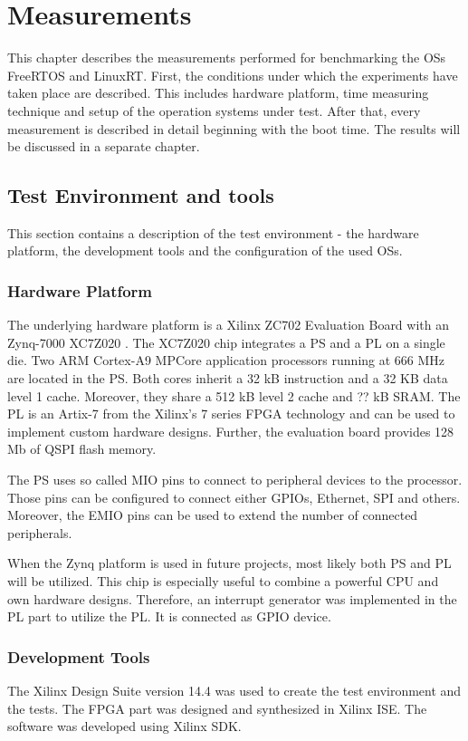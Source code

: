 \chapter{Measurements}\label{ch_measurements}
This chapter describes the measurements performed for benchmarking the \acp{OS} FreeRTOS and LinuxRT.
First, the conditions under which the experiments have taken place are described.
This includes hardware platform, time measuring technique and setup of the operation systems under test.
After that, every measurement is described in detail beginning with the boot time.
The results will be discussed in a separate chapter.

\section{Test Environment and tools}
This section contains a description of the test environment - the hardware platform, the development tools and the configuration of the used \acp{OS}.
\subsection{Hardware Platform}
The underlying hardware platform is a Xilinx ZC702 Evaluation Board \cite{xilinx:zc702_ev_board} with an Zynq-7000 XC7Z020 \cite{xilinx:zynq7000}.
The XC7Z020 chip integrates a \ac{PS} and a \ac{PL} on a single die.
Two ARM Cortex-A9 MPCore application processors running at 666 MHz are located in the \ac{PS}.
Both cores inherit a 32 kB instruction and a 32 KB data level 1 cache.
Moreover, they share a 512 kB level 2 cache and ?? kB SRAM.
The \ac{PL} is an Artix-7 from the Xilinx's 7 series \ac{FPGA} technology and can be used to implement custom hardware designs.
Further, the evaluation board provides 128 Mb of \ac{QSPI} flash memory.
\par
The \ac{PS} uses so called \ac{MIO} pins to connect to peripheral devices to the processor.
Those pins can be configured to connect either \acp{GPIO}, Ethernet, \ac{SPI} and others.
Moreover, the \ac{EMIO} pins can be used to extend the number of connected peripherals.
\par
When the Zynq platform is used in future projects, most likely both \ac{PS} and \ac{PL} will be utilized.
This chip is especially useful to combine a powerful \ac{CPU} and own hardware designs.
Therefore, an interrupt generator was implemented in the \ac{PL} part to utilize the \ac{PL}.
It is connected as \ac{GPIO} device.
\par
\subsection{Development Tools}
The Xilinx Design Suite version 14.4 was used to create the test environment and the tests.
The \ac{FPGA} part was designed and synthesized in Xilinx \ac{ISE}.
The software was developed using Xilinx \ac{SDK}.

